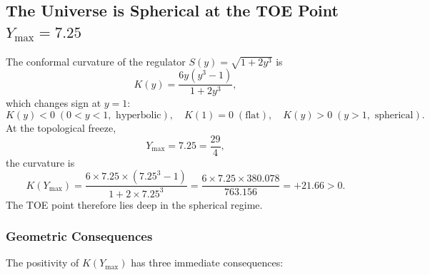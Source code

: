 \documentclass[12pt,oneside,openany]{book}
\begin{document}
\subsection{The Universe is Spherical at the TOE Point $Y_{\max} = 7.25$}
\label{sec:spherical-universe-toe}

The conformal curvature of the regulator $S(y) = \sqrt{1+2y^3}$ is
\begin{equation}
K(y) = \frac{6y(y^3-1)}{1+2y^3},
\label{eq:conformal-curvature-toe}
\end{equation}
which changes sign at $y = 1$:
\begin{equation}
K(y) < 0 \;(0 < y < 1, \text{ hyperbolic}), \quad K(1) = 0 \;(\text{flat}), \quad K(y) > 0 \;(y > 1, \text{ spherical}).
\label{eq:curvature-signs}
\end{equation}
At the topological freeze,
\begin{equation}
Y_{\max} = 7.25 = \frac{29}{4},
\label{eq:Ymax-sphere}
\end{equation}
the curvature is
\begin{equation}
K(Y_{\max}) = \frac{6 \times 7.25 \times (7.25^3 - 1)}{1 + 2 \times 7.25^3} = \frac{6 \times 7.25 \times 380.078}{763.156} = +21.66 > 0.
\label{eq:K-Ymax}
\end{equation}
The TOE point therefore lies deep in the spherical regime.

\subsubsection{Geometric Consequences}

The positivity of $K(Y_{\max})$ has three immediate consequences:
\end{document}

